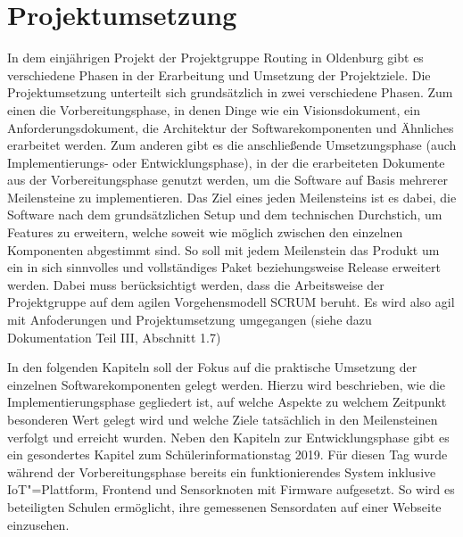 \chapter{Projektumsetzung}
In dem einjährigen Projekt der Projektgruppe Routing in Oldenburg gibt es verschiedene Phasen in der Erarbeitung und Umsetzung der Projektziele.
Die Projektumsetzung unterteilt sich grundsätzlich in zwei verschiedene Phasen.
Zum einen die Vorbereitungsphase, in denen Dinge wie ein Visionsdokument, ein Anforderungsdokument, die Architektur der Softwarekomponenten und Ähnliches erarbeitet werden.
Zum anderen gibt es die anschließende Umsetzungsphase (auch Implementierungs- oder Entwicklungsphase), in der die erarbeiteten Dokumente aus der Vorbereitungsphase genutzt werden, um die Software auf Basis mehrerer Meilensteine zu implementieren.
Das Ziel eines jeden Meilensteins ist es dabei, die Software nach dem grundsätzlichen Setup und dem technischen Durchstich, um Features zu erweitern, welche soweit wie möglich zwischen den einzelnen Komponenten abgestimmt sind.
So soll mit jedem Meilenstein das Produkt um ein in sich sinnvolles und vollständiges Paket beziehungsweise Release erweitert werden.
Dabei muss berücksichtigt werden, dass die Arbeitsweise der Projektgruppe auf dem agilen Vorgehensmodell SCRUM beruht.
Es wird also agil mit Anfoderungen und Projektumsetzung umgegangen (siehe dazu Dokumentation Teil III, Abschnitt 1.7)

In den folgenden Kapiteln soll der Fokus auf die praktische Umsetzung der einzelnen Softwarekomponenten gelegt werden.
Hierzu wird beschrieben, wie die Implementierungsphase gegliedert ist, auf welche Aspekte zu welchem Zeitpunkt besonderen Wert gelegt wird und welche Ziele tatsächlich in den Meilensteinen verfolgt und erreicht wurden.
Neben den Kapiteln zur Entwicklungsphase gibt es ein gesondertes Kapitel zum Schülerinformationstag 2019.
Für diesen Tag wurde während der Vorbereitungsphase bereits ein funktionierendes System inklusive IoT"=Plattform, Frontend und Sensorknoten mit Firmware aufgesetzt.
So wird es beteiligten Schulen ermöglicht, ihre gemessenen Sensordaten auf einer Webseite einzusehen.

